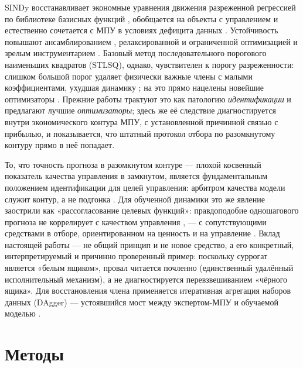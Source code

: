 \documentclass[preprint,3p]{elsarticle}
\begin{document}
SINDy восстанавливает экономные уравнения движения разреженной регрессией по библиотеке
базисных функций \citep{brunton2016sindy}, обобщается на объекты с управлением
\citep{brunton2016sindyc} и естественно сочетается с МПУ в условиях дефицита данных
\citep{kaiser2018sindympc}. Устойчивость повышают ансамблированием \citep{fasel2022ensemble},
релаксированной и ограниченной оптимизацией \citep{champion2020sr3} и зрелым инструментарием
\citep{desilva2020pysindy,kaptanoglu2022pysindy}. Базовый метод последовательного порогового
наименьших квадратов (STLSQ), однако, чувствителен к порогу разреженности: слишком большой
порог удаляет физически важные члены с малыми коэффициентами, ухудшая динамику
\citep{cortiella2021sparse,mangan2017modelselection}; на это прямо нацелены новейшие
оптимизаторы \citep{balanceguided2026}. Прежние работы трактуют это как патологию
\emph{идентификации} и предлагают лучшие \emph{оптимизаторы}; здесь же её следствие
диагностируется внутри экономического контура МПУ, с установленной причинной связью с
прибылью, и показывается, что штатный протокол отбора по разомкнутому контуру прямо в неё
попадает.

То, что точность прогноза в разомкнутом контуре — плохой косвенный показатель качества
управления в замкнутом, является фундаментальным положением идентификации для целей
управления: арбитром качества модели служит контур, а не подгонка
\citep{gevers1993,hjalmarsson1994closing,vandenhof1995closedloop,hjalmarsson2005experiment}.
Для обученной динамики это же явление заострили как «рассогласование целевых функций»:
правдоподобие одношагового прогноза не коррелирует с качеством управления
\citep{lambert2020objective,wei2023unified}, — с сопутствующими средствами в отборе,
ориентированном на ценность и на управление
\citep{farahmand2017value,controlorientedsurvey2025}. Вклад настоящей работы — не общий
принцип и не новое средство, а его конкретный, интерпретируемый и причинно проверенный
пример: поскольку суррогат является «белым ящиком», провал читается почленно (единственный
удалённый исполнительный механизм), а не диагностируется перевзвешиванием «чёрного ящика».
Для восстановления члена применяется итеративная агрегация наборов данных (DAgger)
\citep{ross2011dagger} — устоявшийся мост между экспертом-МПУ и обучаемой моделью
\citep{sun2017deeply,tagliabue2021guided,espin2024deepmpc}.

\section{Методы}
\label{sec:methods}
\end{document}
